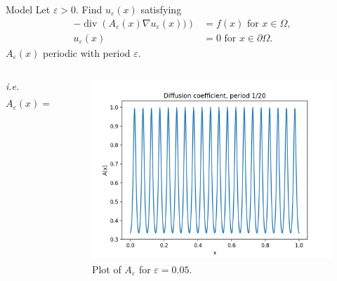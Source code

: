 \documentclass{beamer}
\renewcommand{\epsilon}{\varepsilon}
\renewcommand{\div}[1]{\operatorname{div}\left( #1 \right)}
\begin{document}
\begin{frame}[t]{Model}
    Let $\varepsilon>0$. Find $u_\varepsilon(x)$ satisfying
    \begin{equation}
        \begin{split}
            -\div{A_\varepsilon(x)\nabla u_\varepsilon(x))} &= f(x) \mbox{ for } x \in \Omega,\\
            u_\varepsilon(x) &= 0 \mbox{ for } x \in \partial\Omega.
        \end{split}
        \label{eq:model}
    \end{equation}
     $A_\varepsilon(x)$ periodic with period $\varepsilon$.
     \begin{columns}
         \begin{column}[c]{.5\textwidth}
             \emph{i.e.}
             \[A_\varepsilon(x)= \frac{1}{2+\cos \left( \frac{2\pi x}{\epsilon} \right)}\]
         \end{column}
         \begin{column}[c]{.5\textwidth}
             \begin{figure}[th]
                \centering
                \includegraphics[width=0.9\linewidth]{a_eps.png}
                \caption{Plot of $A_\epsilon$ for $\epsilon=0.05$.}
                \label{fig:one_dim_exact}
            \end{figure}
         \end{column}
     \end{columns}

\end{frame}
\end{document}
